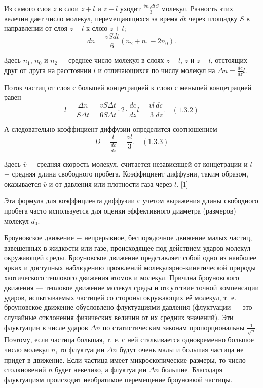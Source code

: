 Из самого слоя $z$ в слои $z+l$ и $z-l$ уходит $\frac{\overline{v}n_0dtS}{3}$ молекул. Разность этих велечин дает число молекул, перемещающихся за время $dt$ через площадку $S$ в направлении от слоя $z-l$ к слою $z+l$;
$$dn = \frac{\overline{v}Sdt}{6}(n_2+n_1-2n_0).$$

Здесь $n_1$, $n_0$ и $n_2 -$ среднее число молекул в слоях $z+l$, $z$ и $z-l$, отстоящих друг от друга на расстоянии $l$ и отличающихся по числу молекул на $\Delta n = \frac{dc}{dz}l$.

Поток частиц от слоя с большей концетрацией к слою с меньшей концетрацией равен
$$l=\frac{\Delta n}{S \Delta t}= \frac{\overline{v}S\Delta t}{6S \Delta t} \cdot 2 \cdot \frac{dc}{dz}l= \frac{\overline{v}l}{3} \frac{dc}{dz}. \quad (1.3.2)$$

А следовательно коэффициент диффузии определится соотношением
$$D=\frac{l}{\frac{dc}{dz}}= \frac{\overline{v}l}{3}. \quad (1.3.3)$$

Здесь $\overline{v}$ $-$ средняя скорость молекул, считается независящей от концетрации и $l$ $-$ средняя длина свободного пробега. Коэффициент диффузии, таким образом, оказывается $\overline{v}$ и от давления или плотности газа через $l$. [1]

Эта формула для коэффициента диффузии с учетом выражения длины свободного пробега часто используется для оценки эффективного диаметра (размеров) молекул $d_0$.

Броуновское движение $-$ непрерывное, беспорядочное движение малых частиц, взвешенных в жидкости или газе, происходящее под действием ударов молекул окружающей среды. Броуновское движение представляет собой одно из наиболее ярких и доступных наблюдению проявлений молекулярно-кинетической природы хаотического теплового движения атомов и молекул.
Причина броуновского движения — тепловое движение молекул среды и отсутствие точной компенсации ударов, испытываемых частицей со стороны окружающих её молекул, т. е. броуновское движение обусловлено флуктуациями давления (флуктуации — это случайные отклонения физических величин от их средних значений). Эти флуктуации в числе ударов $\Delta n$ по статистическим законам пропорциональны $\frac{1}{\sqrt{n}}$. Поэтому, если частица большая, т. е. с ней сталкивается одновременно большое число молекул $n$, то флуктуации $\Delta n$ будут очень малы и большая частица не придет в движение. Если частица имеет микроскопические размеры, то число столкновений $n$ будет невелико, а флуктуации $\Delta n$ большие. Благодаря флуктуациям происходит необратимое перемещение броуновкой частицы.

